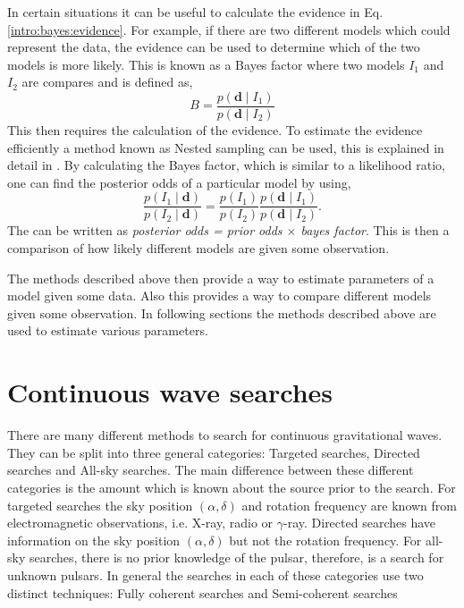 In certain situations it can be useful to calculate the evidence in Eq.\ref{intro:bayes:evidence}. 
For example, if there are two different models which could represent the data, the evidence can be used to determine which of the two models is more likely.
This is known as a Bayes factor where two models $I_1$ and $I_2$ are compares and is defined as,
\begin{equation}
B = \frac{p({\bm d} \mid I_1)}{p({\bm d} \mid I_2)}
\end{equation}
This then requires the calculation of the evidence.
To estimate the evidence efficiently a method known as Nested sampling can be used, this is explained in detail in \citep{skilling2006NestedSampling,speagle2019DynestyDynamic}.
By calculating the Bayes factor, which is similar to a likelihood ratio, one can find the posterior odds of a particular model by using,
\begin{equation}
\frac{p(I_1 \mid \mathbf{d})}{p(I_2 \mid \mathbf{d})} = \frac{p(I_1)}{p(I_2)} \frac{p(\mathbf{d} \mid I_1)}{p(\mathbf{d} \mid I_2)}.
\end{equation}
The can be written as \textit{posterior odds = prior odds $\times$ bayes factor}. This is then a comparison of how likely different models are given some observation. 

The methods described above then provide a way to estimate parameters of a model given some data. 
Also this provides a way to compare different models given some observation.
In following sections the methods described above are used to estimate various parameters.


\section{\label{searchcw:search} Continuous wave searches}

There are many different methods to search for continuous gravitational waves.
They can be split into three general categories: Targeted searches, Directed searches and All-sky searches.
The main difference between these different categories is the amount which is known about the source prior to the search.
For targeted searches the sky position $(\alpha,\delta)$ and rotation frequency are known from electromagnetic observations, i.e. X-ray, radio or $\gamma$-ray.
Directed searches have information on the sky position $(\alpha,\delta)$ but not the rotation frequency.
For all-sky searches, there is no prior knowledge of the pulsar, therefore, is a search for unknown pulsars.
In general the searches in each of these categories use two distinct techniques: Fully coherent searches and Semi-coherent searches

